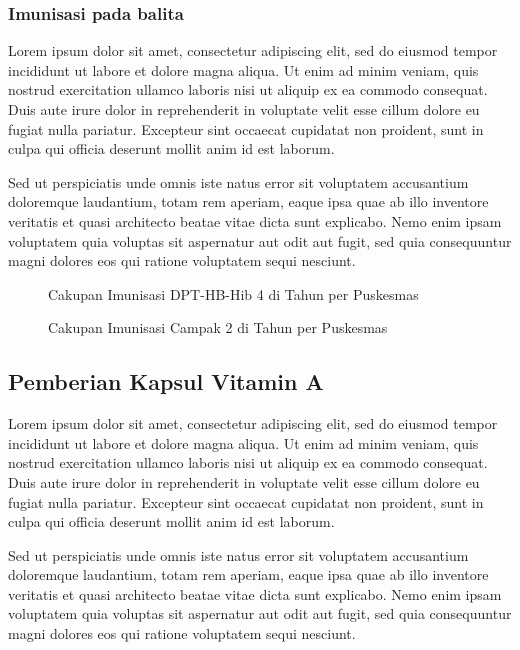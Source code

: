 \subsubsection{Imunisasi pada balita}
Lorem ipsum dolor sit amet, consectetur adipiscing elit, sed do eiusmod tempor incididunt ut labore et dolore magna aliqua. Ut enim ad minim veniam, quis nostrud exercitation ullamco laboris nisi ut aliquip ex ea commodo consequat. Duis aute irure dolor in reprehenderit in voluptate velit esse cillum dolore eu fugiat nulla pariatur. Excepteur sint occaecat cupidatat non proident, sunt in culpa qui officia deserunt mollit anim id est laborum.

Sed ut perspiciatis unde omnis iste natus error sit voluptatem accusantium doloremque laudantium, totam rem aperiam, eaque ipsa quae ab illo inventore veritatis et quasi architecto beatae vitae dicta sunt explicabo. Nemo enim ipsam voluptatem quia voluptas sit aspernatur aut odit aut fugit, sed quia consequuntur magni dolores eos qui ratione voluptatem sequi nesciunt.

\begin{figure}[H]
    \centering
    \caption{Cakupan Imunisasi DPT-HB-Hib 4 di \namaKabupaten Tahun \tP per Puskesmas}
    \label{fig:Cakupan-Imunisasi-DPT4}
\end{figure}

\begin{figure}[H]
    \centering
    \caption{Cakupan Imunisasi Campak 2 di \namaKabupaten Tahun \tP per Puskesmas}
    \label{fig:Cakupan-Imunisasi-Campak2}
\end{figure}

\subsection{Pemberian Kapsul Vitamin A}
Lorem ipsum dolor sit amet, consectetur adipiscing elit, sed do eiusmod tempor incididunt ut labore et dolore magna aliqua. Ut enim ad minim veniam, quis nostrud exercitation ullamco laboris nisi ut aliquip ex ea commodo consequat. Duis aute irure dolor in reprehenderit in voluptate velit esse cillum dolore eu fugiat nulla pariatur. Excepteur sint occaecat cupidatat non proident, sunt in culpa qui officia deserunt mollit anim id est laborum.

Sed ut perspiciatis unde omnis iste natus error sit voluptatem accusantium doloremque laudantium, totam rem aperiam, eaque ipsa quae ab illo inventore veritatis et quasi architecto beatae vitae dicta sunt explicabo. Nemo enim ipsam voluptatem quia voluptas sit aspernatur aut odit aut fugit, sed quia consequuntur magni dolores eos qui ratione voluptatem sequi nesciunt.

